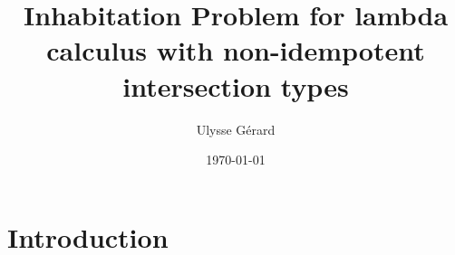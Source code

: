 \documentclass{article}
\title{\textbf{Inhabitation Problem for lambda calculus with non-idempotent intersection types}}
\author{Ulysse Gérard}
\date\today
\begin{document}
\maketitle

\section{Introduction}
\end{document}
